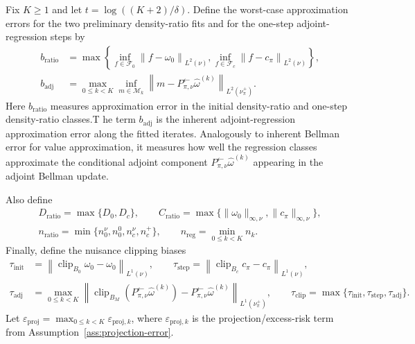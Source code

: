 \documentclass{article}
\newcommand{\sF}{\mathcal{F}}
\newcommand{\sM}{\mathcal{M}}
\newcommand{\1}{\mathbf{1}}
\newcommand{\cpi}{c_\pi}
\newcommand{\omegazero}{\omega_0}
\newcommand{\Pback}{P_{\pi,\nu}^{\leftarrow}}
\newcommand{\Mpi}{\Pback}
\newcommand{\omegahat}{\widehat{\omega}}
\newcommand{\norm}[2][]{\left\lVert #2 \right\rVert_{#1}}
\newcommand{\LoneNu}[1]{\norm[L^1(\nu)]{#1}}
\newcommand{\LoneNuPlus}[1]{\norm[L^1(\nu_\pi^+)]{#1}}
\newcommand{\LtwoNu}[1]{\norm[L^2(\nu)]{#1}}
\newcommand{\LtwoNuPlus}[1]{\norm[L^2(\nu_\pi^+)]{#1}}
\newcommand{\Clip}{\operatorname{clip}}
\theoremstyle{plain}
\theoremstyle{definition}
\theoremstyle{remark}
\begin{document}
Fix \(K\ge 1\) and let \(t=\log((K+2)/\delta)\). Define the worst-case
approximation errors for the two preliminary density-ratio fits and for the
one-step adjoint-regression steps by
\[
\begin{aligned}
    b_{\mathrm{ratio}}
    &=
    \max\left\{
        \inf_{f\in\sF_0}\LtwoNu{f-\omegazero},
        \inf_{f\in\sF_c}\LtwoNu{f-\cpi}
    \right\},\\
    b_{\mathrm{adj}}
    &=
    \max_{0\le k<K}
    \inf_{m\in\sM_k}
    \LtwoNuPlus{m-\Mpi\omegahat^{(k)}} .
\end{aligned}
\]
Here \(b_{\mathrm{ratio}}\) measures approximation error in the initial density-ratio and
one-step density-ratio classes.T he term \(b_{\mathrm{adj}}\) is the inherent adjoint-regression approximation
error along the fitted iterates. Analogously to inherent Bellman error for value
approximation, it measures how well the regression classes approximate the
conditional adjoint component \(\Mpi\omegahat^{(k)}\) appearing in the adjoint
Bellman update.

Also define
\[
\begin{gathered}
    D_{\mathrm{ratio}}=\max\{D_0,D_c\},
    \qquad
    C_{\mathrm{ratio}}
    =
    \max\{\|\omegazero\|_{\infty,\nu},\|\cpi\|_{\infty,\nu}\},\\
    n_{\mathrm{ratio}}
    =
    \min\{n_0^\nu,n_0^0,n_c^\nu,n_c^+\},
    \qquad
    n_{\mathrm{reg}}
    =
    \min_{0\le k<K} n_k .
\end{gathered}
\]
Finally, define the nuisance clipping biases
\[
\begin{aligned}
    \tau_{\mathrm{init}}
    &=
    \LoneNu{\Clip_{B_0}\omegazero-\omegazero},
    \qquad
    \tau_{\mathrm{step}}
    =
    \LoneNu{\Clip_{B_c}\cpi-\cpi},\\
    \tau_{\mathrm{adj}}
    &=
    \max_{0\le k<K}
    \LoneNuPlus{
        \Clip_{B_M}(\Mpi\omegahat^{(k)})
        -
        \Mpi\omegahat^{(k)}
    },
    \qquad
    \tau_{\mathrm{clip}}
    =
    \max\{\tau_{\mathrm{init}},\tau_{\mathrm{step}},\tau_{\mathrm{adj}}\}.
\end{aligned}
\]
Let \(\varepsilon_{\mathrm{proj}}=\max_{0\le k<K}\varepsilon_{\mathrm{proj},k}\),
where \(\varepsilon_{\mathrm{proj},k}\) is the projection/excess-risk term from
Assumption~\ref{ass:projection-error}.
\end{document}
